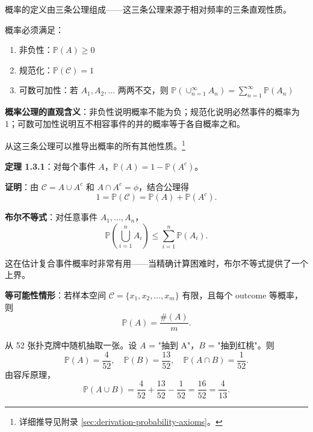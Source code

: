 概率的定义由三条公理组成——这三条公理来源于相对频率的三条直观性质。

概率必须满足：
\begin{enumerate}
    \item 非负性：$\mathbb{P}(A) \geq 0$
    \item 规范化：$\mathbb{P}(\mathcal{C}) = 1$
    \item 可数可加性：若 $A_1, A_2, \ldots$ 两两不交，则 $\mathbb{P}(\cup_{n=1}^{\infty} A_n) = \sum_{n=1}^{\infty} \mathbb{P}(A_n)$
\end{enumerate}

\begin{remark}
\textbf{概率公理的直观含义}：非负性说明概率不能为负；规范化说明必然事件的概率为 1；可数可加性说明互不相容事件的并的概率等于各自概率之和。
\end{remark}

从这三条公理可以推导出概率的所有其他性质。\footnote{详细推导见附录 \cref{sec:derivation-probability-axioms}。}

\begin{remark}
\textbf{定理 1.3.1}：对每个事件 $A$，$\mathbb{P}(A) = 1 - \mathbb{P}(A^c)$。

\textbf{证明}：由 $\mathcal{C} = A \cup A^c$ 和 $A \cap A^c = \phi$，结合公理得
\[
1 = \mathbb{P}(\mathcal{C}) = \mathbb{P}(A) + \mathbb{P}(A^c).
\]
\end{remark}

\textbf{布尔不等式}：对任意事件 $A_1, \ldots, A_n$，
\[
\mathbb{P}\left(\bigcup_{i=1}^{n} A_i\right) \leq \sum_{i=1}^{n} \mathbb{P}(A_i).
\tag{1.3.1}\label{eq:boole-inequality-ch1}
\]

这在估计复合事件概率时非常有用——当精确计算困难时，布尔不等式提供了一个上界。

\begin{remark}
\textbf{等可能性情形}：若样本空间 $\mathcal{C} = \{x_1, x_2, \ldots, x_m\}$ 有限，且每个 outcome 等概率，则
\[
\mathbb{P}(A) = \frac{\#(A)}{m}.
\tag{1.3.2}\label{eq:equilikely-ch1}
\]
\end{remark}

\begin{example}[扑克牌概率]\label{ex:poker-ch1}
从 52 张扑克牌中随机抽取一张。设 $A$ = "抽到 A"，$B$ = "抽到红桃"。则
\[
\mathbb{P}(A) = \frac{4}{52}, \quad \mathbb{P}(B) = \frac{13}{52}, \quad \mathbb{P}(A \cap B) = \frac{1}{52}.
\]
由容斥原理，
\[
\mathbb{P}(A \cup B) = \frac{4}{52} + \frac{13}{52} - \frac{1}{52} = \frac{16}{52} = \frac{4}{13}.
\]
\end{example}

